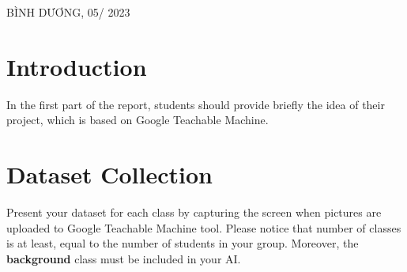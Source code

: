 \documentclass[a4paper,11pt]{article}
\theoremstyle{mytheor}
\begin{document}
\begin{titlepage}
\begin{table}[h]
\begin{tabular}{rrl}
\end{tabular}
\end{table}
\vspace{3cm}
\begin{center}
{\footnotesize BÌNH DƯƠNG, 05/ 2023}
\end{center}
\end{titlepage}

\renewcommand{\contentsname}{Content}
\newpage
\vspace{1cm}
\tableofcontents
\newpage

\section{Introduction}
    

In the first part of the report, students should provide briefly the idea of their project, which is based on Google Teachable Machine.




\section{Dataset Collection}

Present your dataset for each class by capturing the screen when pictures are uploaded to Google Teachable Machine tool. Please notice that number of classes is at least, equal to the number of students in your group. Moreover, the \textbf{background} class must be included in your AI.\\
\end{document}
